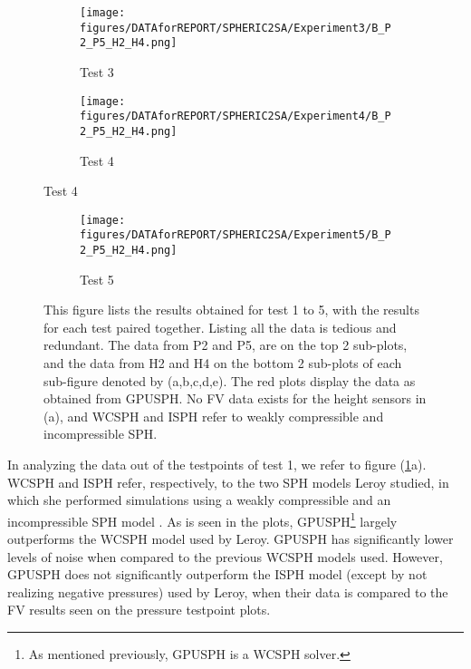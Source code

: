 \documentclass{../GPUSPHtemplate}
\begin{document}
\begin{figure}[H]\ContinuedFloat
  	\begin{subfigure}[b]{1\linewidth}
    		 \texttt{[image: figures/DATAforREPORT/SPHERIC2SA/Experiment3/B\_P2\_P5\_H2\_H4.png]} 
    		 \caption{Test 3}
  	\end{subfigure}%
  	
  	\begin{subfigure}[b]{1\linewidth}
    		\texttt{[image: figures/DATAforREPORT/SPHERIC2SA/Experiment4/B\_P2\_P5\_H2\_H4.png]} 
		\caption{Test 4}  	
  	\end{subfigure}
  	
\end{figure}  	 
  
\begin{figure}[H]\ContinuedFloat  
  	\begin{subfigure}[b]{1\linewidth}
   		\texttt{[image: figures/DATAforREPORT/SPHERIC2SA/Experiment5/B\_P2\_P5\_H2\_H4.png]} 
		\caption{Test 5}
  	\end{subfigure}%

     \caption{This figure lists the results obtained for test 1 to 5, with the results for each test paired together. Listing all the data is tedious and redundant. The data from P2 and P5, are on the top 2 sub-plots, and the data from H2 and H4 on the bottom 2 sub-plots of each sub-figure denoted by (a,b,c,d,e). The red plots display the data as obtained from GPUSPH. No FV data exists for the height sensors in (a), and WCSPH and ISPH refer to weakly compressible and incompressible SPH.}
\label{fig:TestpointsAll}
\end{figure}

In analyzing the data out of the testpoints of test 1, we refer to figure (\ref{fig:TestpointsAll}a). WCSPH and ISPH refer, respectively, to the two SPH models Leroy studied, in which she performed simulations using a weakly compressible and an incompressible SPH model \citep{AgnesLeroy}. As is seen in the plots, GPUSPH\footnote{As mentioned previously, GPUSPH is a WCSPH solver.} largely outperforms the WCSPH model used by Leroy. GPUSPH has significantly lower levels of noise when compared to the previous WCSPH models used. However, GPUSPH does not significantly outperform the ISPH model (except by not realizing negative pressures) used by Leroy, when their data is compared to the FV results seen on the pressure testpoint plots. \\ 
\end{document}
